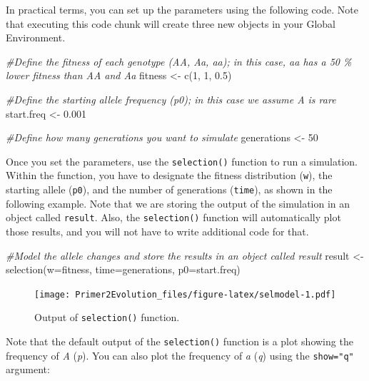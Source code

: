 \documentclass[
]{book}
\newenvironment{Shaded}{\begin{snugshade}}{\end{snugshade}}
\newcommand{\AttributeTok}[1]{\textcolor[rgb]{0.77,0.63,0.00}{#1}}
\newcommand{\CommentTok}[1]{\textcolor[rgb]{0.56,0.35,0.01}{\textit{#1}}}
\newcommand{\DecValTok}[1]{\textcolor[rgb]{0.00,0.00,0.81}{#1}}
\newcommand{\FloatTok}[1]{\textcolor[rgb]{0.00,0.00,0.81}{#1}}
\newcommand{\FunctionTok}[1]{\textcolor[rgb]{0.00,0.00,0.00}{#1}}
\newcommand{\NormalTok}[1]{#1}
\newcommand{\OtherTok}[1]{\textcolor[rgb]{0.56,0.35,0.01}{#1}}
\begin{document}
In practical terms, you can set up the parameters using the following code. Note that executing this code chunk will create three new objects in your Global Environment.

\begin{Shaded}
\begin{Highlighting}[]
\CommentTok{\#Define the fitness of each genotype (AA, Aa, aa); in this case, aa has a 50 \% lower fitness than AA and Aa}
\NormalTok{fitness }\OtherTok{\textless{}{-}} \FunctionTok{c}\NormalTok{(}\DecValTok{1}\NormalTok{, }\DecValTok{1}\NormalTok{, }\FloatTok{0.5}\NormalTok{)}

\CommentTok{\#Define the starting allele frequency (p0); in this case we assume A is rare}
\NormalTok{start.freq }\OtherTok{\textless{}{-}} \FloatTok{0.001}

\CommentTok{\#Define how many generations you want to simulate}
\NormalTok{generations }\OtherTok{\textless{}{-}} \DecValTok{50}
\end{Highlighting}
\end{Shaded}

Once you set the parameters, use the \texttt{selection()} function to run a simulation. Within the function, you have to designate the fitness distribution (\texttt{w}), the starting allele (\texttt{p0}), and the number of generations (\texttt{time}), as shown in the following example. Note that we are storing the output of the simulation in an object called \texttt{result}. Also, the \texttt{selection()} function will automatically plot those results, and you will not have to write additional code for that.

\begin{Shaded}
\begin{Highlighting}[]
\CommentTok{\#Model the allele changes and store the results in an object called result}
\NormalTok{result }\OtherTok{\textless{}{-}} \FunctionTok{selection}\NormalTok{(}\AttributeTok{w=}\NormalTok{fitness, }\AttributeTok{time=}\NormalTok{generations, }\AttributeTok{p0=}\NormalTok{start.freq)}
\end{Highlighting}
\end{Shaded}

\begin{figure}
\centering
\texttt{[image: Primer2Evolution\_files/figure-latex/selmodel-1.pdf]}
\caption{\label{fig:selmodel}Output of \texttt{selection()} function.}
\end{figure}

Note that the default output of the \texttt{selection()} function is a plot showing the frequency of \emph{A} (\emph{p}). You can also plot the frequency of \emph{a} (\emph{q}) using the \texttt{show="q"} argument:
\end{document}

